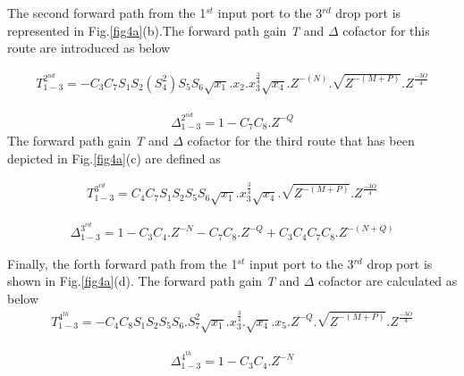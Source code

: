 \documentclass{osa-article}
\begin{document}
The second forward path from the 1$^{st}$ input port to the 3$^{rd}$ drop port is represented in Fig.\ref{fig4a}(b).The forward path gain \textit {T} and $\Delta$ cofactor for this route are introduced as below

\begin{equation}
\begin{split}
T^{2^{nd}}_{1-3}=-C_3C_7S_1S_2(S^2_4)S_5S_6\sqrt{x_1}.x_{2}.{x^{\frac{3}{4}}_3}\sqrt{x_4}.Z^{-(N)}.\sqrt{Z^{-(M+P)}}.Z^{\frac{-3O}{4}}
\end{split}
\end{equation}

\begin{equation}
\begin{split}
\Delta^{2^{nd}}_{1-3}=1-C_7C_8.Z^{-Q}
\end{split}
\end{equation}
The forward path gain \textit {T} and $\Delta$ cofactor for the third route that has been depicted in Fig.\ref{fig4a}(c) are defined as

\begin{equation}
\begin{split}
T^{3^{rd}}_{1-3}=C_4C_7S_1S_2S_5S_6\sqrt{x_1}.{x^{\frac{3}{4}}_3}\sqrt{x_4}.\sqrt{Z^{-(M+P)}}.Z^{\frac{-3O}{4}}
\end{split}
\end{equation}

\begin{equation}
\begin{split}
\Delta^{3^{rd}}_{1-3}=1-C_3C_4.Z^{-N}-C_7C_8.Z^{-Q}+C_3C_4C_7C_8.Z^{-(N+Q)}
\end{split}
\end{equation}

Finally, the forth forward path from the 1$^{st}$ input port to the 3$^{rd}$ drop port is shown in Fig.\ref{fig4a}(d). The forward path gain \textit {T} and $\Delta$ cofactor are calculated as below
\begin{equation}
\begin{split}
T^{4^{th}}_{1-3}=-C_4C_8S_1S_2S_5S_6.S^2_7\sqrt{x_1}.{x^{\frac{3}{4}}_3}.\sqrt{x_4}.x_5.Z^{-Q}.\sqrt{Z^{-(M+P)}}.Z^{\frac{-3O}{4}}
\end{split}
\end{equation}

\begin{equation}
\begin{split}
\Delta^{4^{th}}_{1-3}=1-C_3C_4.Z^{-N}
\end{split}
\end{equation}
\end{document}
